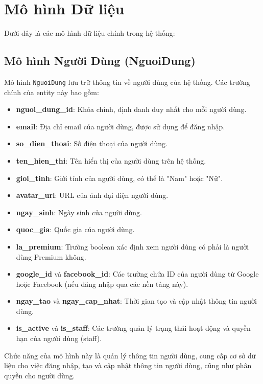 \section{Mô hình Dữ liệu}

Dưới đây là các mô hình dữ liệu chính trong hệ thống:

\subsection{Mô hình Người Dùng (NguoiDung)}
Mô hình \texttt{NguoiDung} lưu trữ thông tin về người dùng của hệ thống. Các trường chính của entity này bao gồm:
\begin{itemize}
    \item \textbf{nguoi\_dung\_id}: Khóa chính, định danh duy nhất cho mỗi người dùng.
    \item \textbf{email}: Địa chỉ email của người dùng, được sử dụng để đăng nhập.
    \item \textbf{so\_dien\_thoai}: Số điện thoại của người dùng.
    \item \textbf{ten\_hien\_thi}: Tên hiển thị của người dùng trên hệ thống.
    \item \textbf{gioi\_tinh}: Giới tính của người dùng, có thể là "Nam" hoặc "Nữ".
    \item \textbf{avatar\_url}: URL của ảnh đại diện người dùng.
    \item \textbf{ngay\_sinh}: Ngày sinh của người dùng.
    \item \textbf{quoc\_gia}: Quốc gia của người dùng.
    \item \textbf{la\_premium}: Trường boolean xác định xem người dùng có phải là người dùng Premium không.
    \item \textbf{google\_id} và \textbf{facebook\_id}: Các trường chứa ID của người dùng từ Google hoặc Facebook (nếu đăng nhập qua các nền tảng này).
    \item \textbf{ngay\_tao} và \textbf{ngay\_cap\_nhat}: Thời gian tạo và cập nhật thông tin người dùng.
    \item \textbf{is\_active} và \textbf{is\_staff}: Các trường quản lý trạng thái hoạt động và quyền hạn của người dùng (staff).
\end{itemize}

Chức năng của mô hình này là quản lý thông tin người dùng, cung cấp cơ sở dữ liệu cho việc đăng nhập, tạo và cập nhật thông tin người dùng, cũng như phân quyền cho người dùng.

